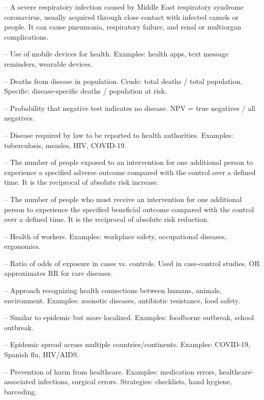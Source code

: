 -- A severe respiratory infection caused by Middle East respiratory syndrome coronavirus, usually acquired through close contact with infected camels or people. It can cause pneumonia, respiratory failure, and renal or multiorgan complications.

-- Use of mobile devices for health. Examples: health apps, text message reminders, wearable devices.


-- Deaths from disease in population. Crude: total deaths / total population. Specific: disease-specific deaths / population at risk.

-- Probability that negative test indicates no disease. NPV = true negatives / all negatives.

-- Disease required by law to be reported to health authorities. Examples: tuberculosis, measles, HIV, COVID-19.


-- The number of people exposed to an intervention for one additional person to experience a specified adverse outcome compared with the control over a defined time. It is the reciprocal of absolute risk increase.

-- The number of people who must receive an intervention for one additional person to experience the specified beneficial outcome compared with the control over a defined time. It is the reciprocal of absolute risk reduction.

-- Health of workers. Examples: workplace safety, occupational diseases, ergonomics.

-- Ratio of odds of exposure in cases vs. controls. Used in case-control studies. OR approximates RR for rare diseases.

-- Approach recognizing health connections between humans, animals, environment. Examples: zoonotic diseases, antibiotic resistance, food safety.

-- Similar to epidemic but more localized. Examples: foodborne outbreak, school outbreak.


-- Epidemic spread across multiple countries/continents. Examples: COVID-19, Spanish flu, HIV/AIDS.

-- Prevention of harm from healthcare. Examples: medication errors, healthcare-associated infections, surgical errors. Strategies: checklists, hand hygiene, barcoding.


